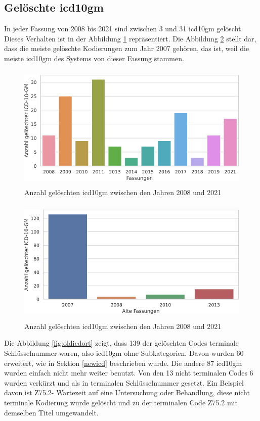 \subsection{Gelöschte \acs{icd10gm}}

In jeder Fassung von 2008 bis 2021 sind zwischen \textsf{3} und \textsf{31} \ac{icd10gm} gelöscht. Dieses Verhalten ist in der Abbildung \ref{fig:newdeleteoldicdyear} repräsentiert. Die Abbildung \ref{fig:oldicdyear} stellt dar, dass die meiste gelöschte Kodierungen zum Jahr 2007 gehören, das ist, weil die meiste \ac{icd10gm} des Systems von dieser Fassung stammen.

\begin{figure}[ht]
	\centering
	\includegraphics[height=6cm]{figures/neuVersionDelete}
	\caption[Gelöschte \acs{icd10gm} pro Jahr]{Anzahl gelöschten \acs{icd10gm} zwischen den Jahren 2008 und 2021}
	\label{fig:newdeleteoldicdyear}
\end{figure} 

\begin{figure}[ht]
	\centering
	\includegraphics[height=6cm]{figures/oldVersionDelete}
	\caption[Gelöschte \acs{icd10gm} und deren alten Fassungen]{Anzahl gelöschten \acs{icd10gm} zwischen den Jahren 2008 und 2021}
	\label{fig:oldicdyear}
\end{figure} 

Die Abbildung \ref{fig:oldicdort} zeigt, dass \textsf{139} der gelöschten Codes terminale Schlüsselnummer waren, also \ac{icd10gm} ohne Subkategorien. Davon wurden \textsf{60} erweitert, wie in Sektion \ref{newicd} beschrieben wurde. Die andere \textsf{87} \ac{icd10gm} wurden einfach nicht mehr weiter benutzt. Von den \textsf{13} nicht terminalen Codes \textsf{6} wurden verkürzt und als in terminalen Schlüsselnummer gesetzt. Ein Beispiel davon ist \textsf{Z75.2-} \textsf{Wartezeit auf eine Untersuchung oder Behandlung}, diese nicht terminale Kodierung wurde gelöscht und zu der terminalen Code \textsf{Z75.2} mit demselben Titel umgewandelt.


